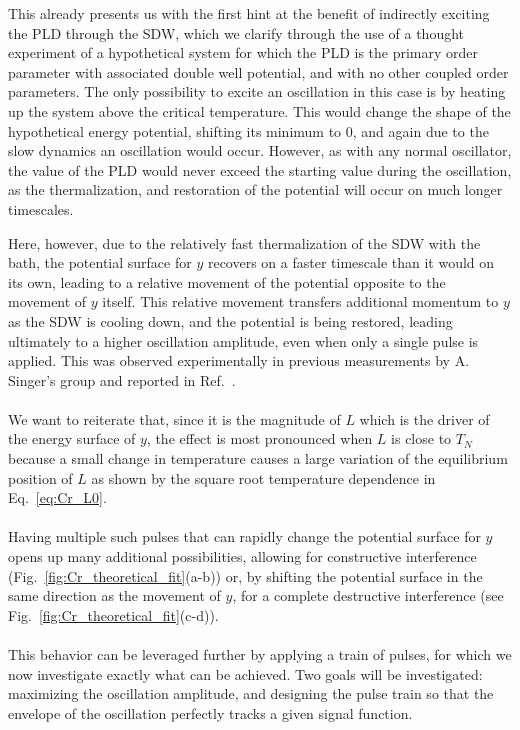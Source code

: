 This already presents us with the first hint at the benefit of indirectly exciting the PLD through the SDW, which we clarify through the use of a thought experiment of a hypothetical system for which the PLD is the primary order parameter with associated double well potential, and with no other coupled order parameters.
The only possibility to excite an oscillation in this case is by heating up the system above the critical temperature.
This would change the shape of the hypothetical energy potential, shifting its minimum to 0, and again due to the slow dynamics an oscillation would occur.
However, as with any normal oscillator, the value of the PLD would never exceed the starting value during the oscillation, as the thermalization, and restoration of the potential will occur on much longer timescales.

Here, however, due to the relatively fast thermalization of the SDW with the bath, the potential surface for $y$ recovers on a faster timescale than it would on its own, leading to a relative movement of the potential opposite to the movement of $y$ itself.
This relative movement transfers additional momentum to $y$ as the SDW is cooling down, and the potential is being restored, leading ultimately to a higher oscillation amplitude, even when only a single pulse is applied.
This was observed experimentally in previous measurements by A. Singer's group and reported in Ref.~\cite{Singer2015prl}. 
\\\\
We want to reiterate that, since it is the magnitude of $L$ which is the driver of the energy surface of $y$, the effect is most pronounced when $L$ is close to $T_N$ because a small change in temperature causes a large variation of the equilibrium position of $L$ as shown by the square root temperature dependence in Eq.~\eqref{eq:Cr_L0}.    
\\\\
Having multiple such pulses that can rapidly change the potential surface for $y$ opens up many additional possibilities, allowing for constructive interference (Fig.~\ref{fig:Cr_theoretical_fit}(a-b)) or, by shifting the potential surface in the same direction as the movement of $y$, for a complete destructive interference (see Fig.~\ref{fig:Cr_theoretical_fit}(c-d)).
\\\\
This behavior can be leveraged further by applying a train of pulses, for which we now investigate exactly what can be achieved.
Two goals will be investigated: maximizing the oscillation amplitude, and designing the pulse train so that the envelope of the oscillation perfectly tracks a given signal function. 
